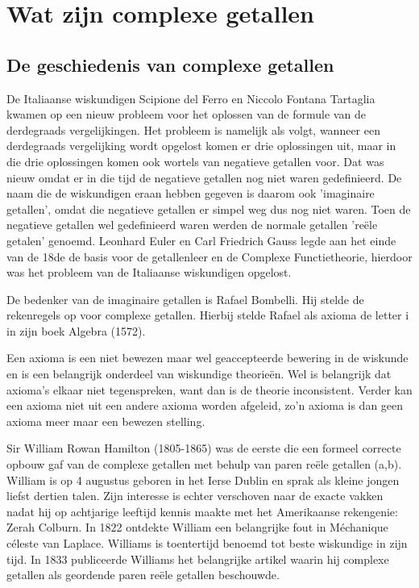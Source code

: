 \documentclass[11pt,fleqn]{book} %
\begin{document}
\chapter{Wat zijn complexe getallen}

\section{De geschiedenis van complexe getallen}

De Italiaanse wiskundigen Scipione del Ferro en Niccolo Fontana Tartaglia kwamen op een nieuw probleem voor het oplossen van de formule van de derdegraads vergelijkingen. Het probleem is namelijk als volgt, wanneer een derdegraads vergelijking wordt opgelost komen er drie oplossingen uit, maar in die drie oplossingen komen ook wortels van negatieve getallen voor. Dat was nieuw omdat er in die tijd de negatieve getallen nog niet waren gedefinieerd. De naam die de wiskundigen eraan hebben gegeven is daarom ook 'imaginaire getallen', omdat die negatieve getallen er simpel weg dus nog niet waren. Toen de negatieve getallen wel gedefinieerd waren werden de normale getallen 'reële getalen' genoemd. Leonhard Euler en Carl Friedrich Gauss legde aan het einde van de 18de de basis voor de getallenleer en de Complexe Functietheorie, hierdoor was het probleem van de Italiaanse wiskundigen opgelost.

De bedenker van de imaginaire getallen is Rafael Bombelli. Hij stelde de rekenregels op voor complexe getallen. Hierbij stelde Rafael als axioma de letter i in zijn boek Algebra (1572).

Een axioma is een niet bewezen maar wel geaccepteerde bewering in de wiskunde en is een belangrijk onderdeel van wiskundige theorieën. Wel is belangrijk dat axioma’s elkaar niet tegenspreken, want dan is de theorie inconsistent. Verder kan een axioma niet uit een andere axioma worden afgeleid, zo’n axioma is dan geen axioma meer maar een bewezen stelling.

Sir William Rowan Hamilton (1805-1865) was de eerste die een formeel correcte opbouw gaf van de complexe getallen met behulp van paren reële getallen (a,b). William is op 4 augustus geboren in het Ierse Dublin en sprak als kleine jongen liefst dertien talen. Zijn interesse is echter verschoven naar de exacte vakken nadat hij op achtjarige leeftijd kennis maakte met het Amerikaanse rekengenie: Zerah Colburn. In 1822 ontdekte William een belangrijke fout in Méchanique céleste van Laplace. Williams is toentertijd benoemd tot beste wiskundige in zijn tijd. In 1833 publiceerde Williams het belangrijke artikel waarin hij complexe getallen als geordende paren reële getallen beschouwde.
\end{document}

